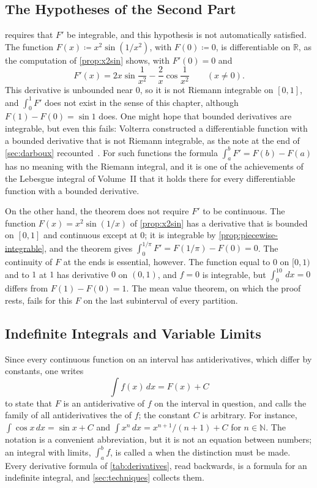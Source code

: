 \subsection{The Hypotheses of the Second Part}

 requires that $F'$ be integrable, and this hypothesis is not automatically satisfied. The function $F(x)\coloneqq x^2\sin(1/x^2)$, with $F(0)\coloneqq0$, is differentiable on $\mathbb R$, as the computation of \cref{prop:x2sin} shows, with $F'(0)=0$ and
\[
F'(x)=2x\sin\frac1{x^2}-\frac2x\cos\frac1{x^2}\qquad(x\ne0).
\]
This derivative is unbounded near $0$, so it is not Riemann integrable on $[0,1]$, and $\int_0^1F'$ does not exist in the sense of this chapter, although $F(1)-F(0)=\sin1$ does. One might hope that bounded derivatives are integrable, but even this fails: Volterra constructed a differentiable function with a bounded derivative that is not Riemann integrable, as the note at the end of \cref{sec:darboux} recounted~\cite{volterra1881}. For such functions the formula $\int_a^bF'=F(b)-F(a)$ has no meaning with the Riemann integral, and it is one of the achievements of the Lebesgue integral of Volume~II that it holds there for every differentiable function with a bounded derivative.

On the other hand, the theorem does not require $F'$ to be continuous. The function $F(x)=x^2\sin(1/x)$ of \cref{prop:x2sin} has a derivative that is bounded on $[0,1]$ and continuous except at $0$; it is integrable by \cref{prop:piecewise-integrable}, and the theorem gives $\int_0^{1/\pi}F'=F(1/\pi)-F(0)=0$. The continuity of $F$ at the ends is essential, however. The function equal to $0$ on $[0,1)$ and to $1$ at $1$ has derivative $0$ on $(0,1)$, and $f=0$ is integrable, but $\int_0^10\,dx=0$ differs from $F(1)-F(0)=1$. The mean value theorem, on which the proof rests, fails for this $F$ on the last subinterval of every partition.

\subsection{Indefinite Integrals and Variable Limits}

Since every continuous function on an interval has antiderivatives, which differ by constants, one writes
\[
\int f(x)\,dx=F(x)+C
\]
to state that $F$ is an antiderivative of $f$ on the interval in question, and calls the family of all antiderivatives the  of $f$; the constant $C$ is arbitrary. For instance, $\int\cos x\,dx=\sin x+C$ and $\int x^n\,dx=x^{n+1}/(n+1)+C$ for $n\in\mathbb N$. The notation is a convenient abbreviation, but it is not an equation between numbers; an integral with limits, $\int_a^bf$, is called a  when the distinction must be made. Every derivative formula of \cref{tab:derivatives}, read backwards, is a formula for an indefinite integral, and \cref{sec:techniques} collects them.

